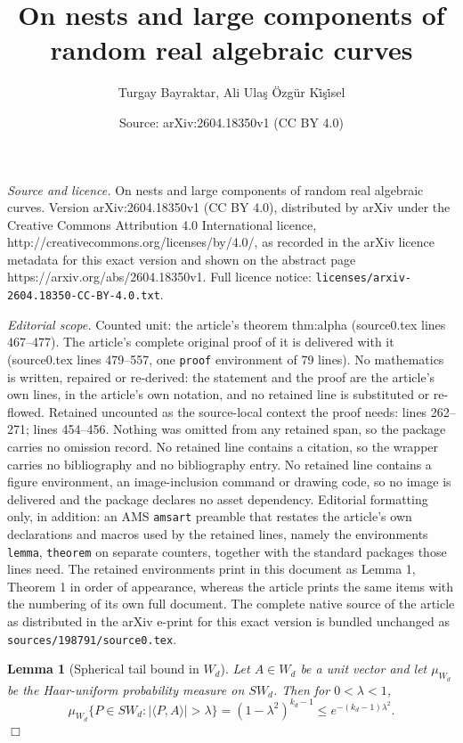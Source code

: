 \documentclass[10pt,a4paper]{amsart}
\title{On nests and large components of random real algebraic curves}
\author{Turgay Bayraktar, Ali Ula\c{s} \"{O}zg\"ur K{\.i}\c{s}{\.i}sel}
\date{Source: arXiv:2604.18350v1 (CC BY 4.0)}
\newtheorem{lemma}{Lemma}
\begin{document}
\maketitle

\noindent\emph{Source and licence.} On nests and large components of random real algebraic curves. Version arXiv:2604.18350v1 (CC BY 4.0), distributed by arXiv under the Creative Commons Attribution 4.0 International licence, http://creativecommons.org/licenses/by/4.0/, as recorded in the arXiv licence metadata for this exact version and shown on the abstract page https://arxiv.org/abs/2604.18350v1. Full licence notice: \texttt{licenses/arxiv-2604.18350-CC-BY-4.0.txt}.\par\smallskip

\noindent\textit{Editorial scope.} Counted unit: the article's theorem thm:alpha (source0.tex lines 467--477). The article's complete original proof of it is delivered with it (source0.tex lines 479--557, one \texttt{proof} environment of 79 lines). No mathematics is written, repaired or re-derived: the statement and the proof are the article's own lines, in the article's own notation, and no retained line is substituted or re-flowed.  Retained uncounted as the source-local context the proof needs: lines 262--271; lines 454--456.  Nothing was omitted from any retained span, so the package carries no omission record.  No retained line contains a citation, so the wrapper carries no bibliography and no bibliography entry.  No retained line contains a figure environment, an image-inclusion command or drawing code, so no image is delivered and the package declares no asset dependency.  Editorial formatting only, in addition: an AMS \texttt{amsart} preamble that restates the article's own declarations and macros used by the retained lines, namely the environments \texttt{lemma}, \texttt{theorem} on separate counters, together with the standard packages those lines need.  The retained environments print in this document as Lemma 1, Theorem 1 in order of appearance, whereas the article prints the same items with the numbering of its own full document.  The complete native source of the article as distributed in the arXiv e-print for this exact version is bundled unchanged as \texttt{sources/198791/source0.tex}.
\begin{lemma}[Spherical tail bound in $W_d$]\label{lem:subspace-spherical}
Let $A\in W_d$ be a unit vector and let $\mu_{W_d}$ be the Haar-uniform probability measure on $SW_d$.
Then for $0<\lambda<1$,
\[
\mu_{W_d}\big\{ P\in SW_d: |\langle P, A\rangle |>\lambda \big\}
=(1-\lambda^2)^{k_d-1}
\le e^{-(k_d-1)\lambda^2}.
\]
\hfill $\Box$
\end{lemma}
\end{document}
